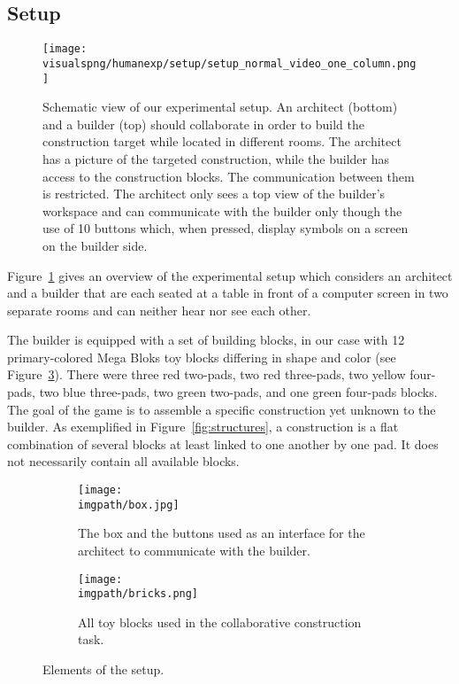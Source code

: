 \subsection{Setup}

\begin{figure}[!htbp]
\centering
\texttt{[image: \\visualspng/humanexp/setup/setup\_normal\_video\_one\_column.png]}
\caption{Schematic view of our experimental setup. An architect (bottom) and a builder (top) should collaborate in order to build the construction target while located in different rooms. The architect has a picture of the targeted construction, while the builder has access to the construction blocks. The communication between them is restricted. The architect only sees a top view of the builder's workspace and can communicate with the builder only though the use of 10 buttons which, when pressed, display symbols on a screen on the builder side.}
\label{fig:overviewsetup}
\end{figure}

Figure~\ref{fig:overviewsetup} gives an overview of the experimental setup which considers an architect and a builder that are each seated at a table in front of a computer screen in two separate rooms and can neither hear nor see each other. 

The builder is equipped with a set of building blocks, in our case with 12 primary-colored Mega Bloks\textsuperscript{\textregistered} toy blocks differing in shape and color (see Figure~\ref{fig:bricks}). There were three red two-pads, two red three-pads, two yellow four-pads, two blue three-pads, two green two-pads, and one green four-pads blocks.
The goal of the game is to assemble a specific construction yet unknown to the builder. As exemplified in Figure~\ref{fig:structures}, a construction is a flat combination of several blocks at least linked to one another by one pad. It does not necessarily contain all available blocks.

\begin{figure}[!htbp]
\centering
\begin{subfigure}[b]{0.49\columnwidth}
          \centering
          \texttt{[image: \\imgpath/box.jpg]}
          \caption{The box and the buttons used as an interface for the architect to communicate with the builder.}
          \label{fig:box}
\end{subfigure}
\begin{subfigure}[b]{0.49\columnwidth}
          \centering
          \texttt{[image: \\imgpath/bricks.png]}
          \caption{All toy blocks used in the collaborative construction task.}
          \label{fig:bricks}
\end{subfigure}
\caption{Elements of the setup.}
\label{fig:stuff}
\end{figure}

